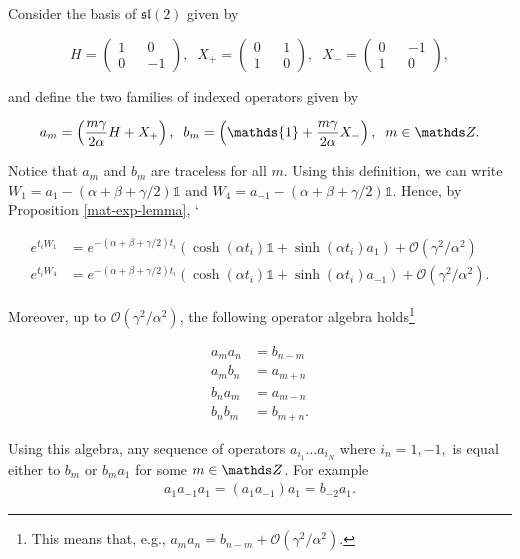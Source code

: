 Consider the basis of $\mathfrak{sl}(2)$ given by 

\begin{equation}
  H = \begin{pmatrix}1 && 0 \\ 0 && -1 \end{pmatrix}, \; \; X_+ = \begin{pmatrix}0 && 1 \\ 1 && 0 \end{pmatrix}, \;\; X_- = \begin{pmatrix}0 && -1 \\ 1 && 0 \end{pmatrix},
\end{equation}

and define the two families of indexed operators given by 

\begin{align}
  a_m = \left(\frac{m\gamma}{2\alpha}H + X_+ \right), \; \;
  b_m = \left(\mathds{1} + \frac{m\gamma}{2\alpha}X_-\right), \; \; m\in \bZ.
\end{align}

Notice that $a_m$ and $b_m$ are traceless for all $m$. Using this definition, we can write $W_1 = a_1 - (\alpha + \beta + \gamma/2) \mathds{1}$ and $W_4 = a_{-1} - (\alpha + \beta + \gamma/2)\mathds{1}$. Hence, by Proposition \ref{mat-exp-lemma}, `

\begin{align}\label{W1-exponential}
e^{t_iW_1} &= e^{-(\alpha +\beta+\gamma/2)t_i}\left(\cosh(\alpha t_i)\mathds{1} + \sinh(\alpha t_i) a_1 \right) + \mathcal{O}(\gamma^2/\alpha^2) \\
\label{W4-exponential}
e^{t_iW_4} &= e^{-(\alpha +\beta+\gamma/2)t_i}\left(\cosh(\alpha t_i)\mathds{1} + \sinh(\alpha t_i) a_{-1} \right) + \mathcal{O}(\gamma^2/\alpha^2).
\end{align}

Moreover, up to $\mathcal{O}(\gamma^2/\alpha^2)$, the following operator algebra holds\footnote{This means that, e.g., $a_ma_n = b_{n-m} + \mathcal{O}(\gamma^2/\alpha^2)$.}

\begin{align} 
a_ma_n &= b_{n-m} \\
  a_mb_n &= a_{m+n} \\
  b_na_m &= a_{m-n} \\
  b_nb_m &= b_{m+n}.
\end{align}

Using this algebra, any sequence of operators $a_{i_1}\ldots a_{i_N}$ where $i_n = 1, -1,$ is equal either to $b_m$ or $b_ma_1$ for some $m \in \bZ$. For example
\begin{align}
a_1a_{-1}a_{1} = (a_1a_{-1})a_{1} = b_{-2}a_{1}.
\end{align}

